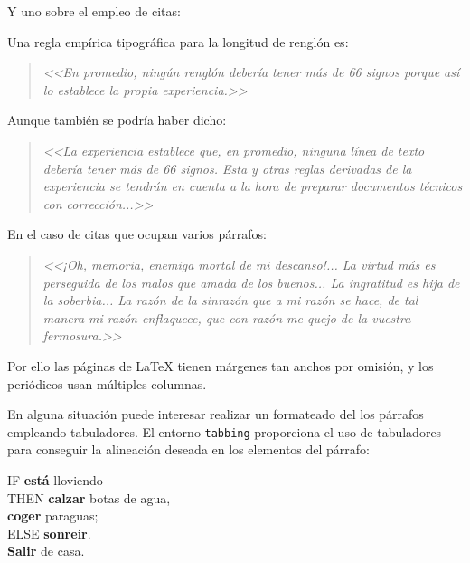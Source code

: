 \documentclass[11pt,a4paper]{article}
\begin{document}
\noindent Y uno sobre el empleo de citas:

Una regla empírica tipográfica para la longitud de renglón es:

\begin{quote}
\emph{<<En promedio, ningún renglón debería tener más de 66 signos porque así lo establece la propia experiencia.>>}
\end{quote}


Aunque también se podría haber dicho:


\begin{quote}
\emph{<<La experiencia establece que, en promedio, ninguna línea de texto debería tener más de 66 signos. Esta y otras reglas derivadas de la experiencia se tendrán en cuenta a la hora de preparar documentos técnicos con corrección...>>}
\end{quote}

En el caso de citas que ocupan varios párrafos:


\begin{quotation}
{\em <<¡Oh, memoria, enemiga mortal de mi descanso!...
La virtud más es perseguida de los malos que amada de los buenos...
La ingratitud es hija de la soberbia...
La razón de la sinrazón que a mi razón se hace, de tal manera mi razón enflaquece, que con razón me quejo de la vuestra fermosura.>>}
\end{quotation}

Por ello las páginas de \LaTeX{} tienen márgenes tan anchos por omisión, y los periódicos usan múltiples columnas. 

En alguna situación puede interesar realizar un formateado del los párrafos empleando tabuladores. El entorno \texttt{tabbing} proporciona el uso de tabuladores para conseguir la alineación deseada en los elementos del párrafo:





\begin{tabbing}
IF	\= \textbf{está} lloviendo                \\
    \> THEN \= \textbf{calzar} botas de agua, \\
    \>      \> \textbf{coger} paraguas;       \\
    \> ELSE \> \textbf{sonreir}.              \\
\textbf{Salir} de casa.
\end{tabbing}
\end{document}
